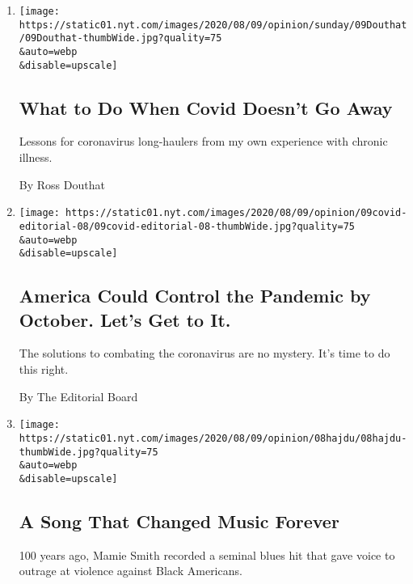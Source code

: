 \begin{enumerate}
\def\labelenumi{\arabic{enumi}.}
\item
  \href{/2020/08/08/opinion/sunday/covid-lyme-treatment-medicine.html}{}

  \texttt{[image: https://static01.nyt.com/images/2020/08/09/opinion/sunday/09Douthat/09Douthat-thumbWide.jpg?quality=75\\\&auto=webp\\\&disable=upscale]}

  \hypertarget{what-to-do-when-covid-doesnt-go-away}{%
  \subsection{What to Do When Covid Doesn't Go
  Away}\label{what-to-do-when-covid-doesnt-go-away}}

  Lessons for coronavirus long-haulers from my own experience with
  chronic illness.

  By Ross Douthat
\item
  \href{/2020/08/08/opinion/sunday/coronavirus-response-testing-lockdown.html}{}

  \texttt{[image: https://static01.nyt.com/images/2020/08/09/opinion/09covid-editorial-08/09covid-editorial-08-thumbWide.jpg?quality=75\\\&auto=webp\\\&disable=upscale]}

  \hypertarget{america-could-control-the-pandemic-by-october-lets-get-to-it}{%
  \subsection{America Could Control the Pandemic by October. Let's Get
  to
  It.}\label{america-could-control-the-pandemic-by-october-lets-get-to-it}}

  The solutions to combating the coronavirus are no mystery. It's time
  to do this right.

  By The Editorial Board
\item
  \href{/2020/08/08/opinion/sunday/crazy-blues-mamie-smith.html}{}

  \texttt{[image: https://static01.nyt.com/images/2020/08/09/opinion/08hajdu/08hajdu-thumbWide.jpg?quality=75\\\&auto=webp\\\&disable=upscale]}

  \hypertarget{a-song-that-changed-music-forever}{%
  \subsection{A Song That Changed Music
  Forever}\label{a-song-that-changed-music-forever}}

  100 years ago, Mamie Smith recorded a seminal blues hit that gave
  voice to outrage at violence against Black Americans.


\end{enumerate}

